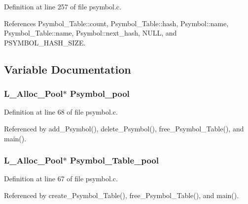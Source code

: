 Definition at line 257 of file psymbol.c.

References Psymbol\_\-Table::count, Psymbol\_\-Table::hash, Psymbol::name, Psymbol\_\-Table::name, Psymbol::next\_\-hash, NULL, and PSYMBOL\_\-HASH\_\-SIZE.

\subsection{Variable Documentation}
\subsubsection{\setlength{\rightskip}{0pt plus 5cm}\bf{L\_\-Alloc\_\-Pool}$\ast$ \bf{Psymbol\_\-pool}}\label{psymbol_8h_5083a45146f9908a31dac227cbe18aac}




Definition at line 68 of file psymbol.c.

Referenced by add\_\-Psymbol(), delete\_\-Psymbol(), free\_\-Psymbol\_\-Table(), and main().
\subsubsection{\setlength{\rightskip}{0pt plus 5cm}\bf{L\_\-Alloc\_\-Pool}$\ast$ \bf{Psymbol\_\-Table\_\-pool}}\label{psymbol_8h_2d729e93a340ce1b90a4aba0da407dc3}




Definition at line 67 of file psymbol.c.

Referenced by create\_\-Psymbol\_\-Table(), free\_\-Psymbol\_\-Table(), and main().